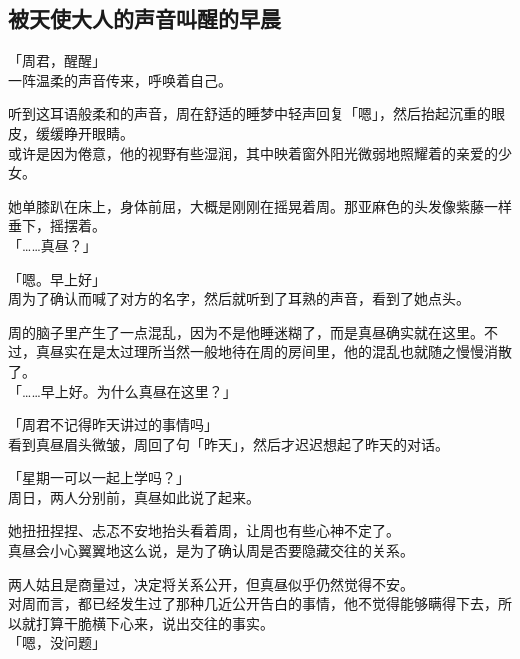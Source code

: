\subsection{被天使大人的声音叫醒的早晨}

「周君，醒醒」\\

一阵温柔的声音传来，呼唤着自己。

听到这耳语般柔和的声音，周在舒适的睡梦中轻声回复「嗯」，然后抬起沉重的眼皮，缓缓睁开眼睛。\\

或许是因为倦意，他的视野有些湿润，其中映着窗外阳光微弱地照耀着的亲爱的少女。

她单膝趴在床上，身体前屈，大概是刚刚在摇晃着周。那亚麻色的头发像紫藤一样垂下，摇摆着。\\

「……真昼？」

「嗯。早上好」\\

周为了确认而喊了对方的名字，然后就听到了耳熟的声音，看到了她点头。

周的脑子里产生了一点混乱，因为不是他睡迷糊了，而是真昼确实就在这里。不过，真昼实在是太过理所当然一般地待在周的房间里，他的混乱也就随之慢慢消散了。\\

「……早上好。为什么真昼在这里？」

「周君不记得昨天讲过的事情吗」\\

看到真昼眉头微皱，周回了句「昨天」，然后才迟迟想起了昨天的对话。\\

\vspace{2\baselineskip}

「星期一可以一起上学吗？」\\

周日，两人分别前，真昼如此说了起来。

她扭扭捏捏、忐忑不安地抬头看着周，让周也有些心神不定了。\\

真昼会小心翼翼地这么说，是为了确认周是否要隐藏交往的关系。

两人姑且是商量过，决定将关系公开，但真昼似乎仍然觉得不安。\\

对周而言，都已经发生过了那种几近公开告白的事情，他不觉得能够瞒得下去，所以就打算干脆横下心来，说出交往的事实。\\

「嗯，没问题」

